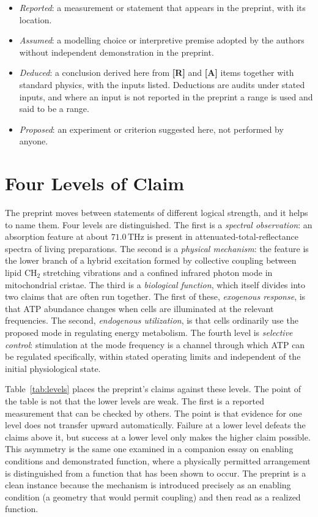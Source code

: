\documentclass[11pt]{article}
\newcommand{\stR}{\textbf{\textcolor{blue!55!black}{[R]}}}
\newcommand{\stA}{\textbf{\textcolor{orange!70!black}{[A]}}}
\newcommand{\stD}{\textbf{\textcolor{green!40!black}{[D]}}}
\newcommand{\stP}{\textbf{\textcolor{violet!80!black}{[P]}}}
\newcommand{\thz}{\,\mathrm{THz}}
\theoremstyle{plain}
\theoremstyle{definition}
\theoremstyle{remark}
\begin{document}
\begin{itemize}[leftmargin=2.2em,itemsep=0.2em]
\item[\stR] \emph{Reported}: a measurement or statement that appears in the preprint, with its location.
\item[\stA] \emph{Assumed}: a modelling choice or interpretive premise adopted by the authors without independent demonstration in the preprint.
\item[\stD] \emph{Deduced}: a conclusion derived here from \stR{} and \stA{} items together with standard physics, with the inputs listed. Deductions are audits under stated inputs, and where an input is not reported in the preprint a range is used and said to be a range.
\item[\stP] \emph{Proposed}: an experiment or criterion suggested here, not performed by anyone.
\end{itemize}

\section{Four Levels of Claim}
\label{sec:levels}

The preprint moves between statements of different logical strength, and it helps to name them. Four levels are distinguished. The first is a \emph{spectral observation}: an absorption feature at about $71.0\thz$ is present in attenuated-total-reflectance spectra of living preparations. The second is a \emph{physical mechanism}: the feature is the lower branch of a hybrid excitation formed by collective coupling between lipid CH$_2$ stretching vibrations and a confined infrared photon mode in mitochondrial cristae. The third is a \emph{biological function}, which itself divides into two claims that are often run together. The first of these, \emph{exogenous response}, is that ATP abundance changes when cells are illuminated at the relevant frequencies. The second, \emph{endogenous utilization}, is that cells ordinarily use the proposed mode in regulating energy metabolism. The fourth level is \emph{selective control}: stimulation at the mode frequency is a channel through which ATP can be regulated specifically, within stated operating limits and independent of the initial physiological state.

Table~\ref{tab:levels} places the preprint's claims against these levels. The point of the table is not that the lower levels are weak. The first is a reported measurement that can be checked by others. The point is that evidence for one level does not transfer upward automatically. Failure at a lower level defeats the claims above it, but success at a lower level only makes the higher claim possible. This asymmetry is the same one examined in a companion essay on enabling conditions and demonstrated function, where a physically permitted arrangement is distinguished from a function that has been shown to occur. The preprint is a clean instance because the mechanism is introduced precisely as an enabling condition (a geometry that would permit coupling) and then read as a realized function.
\end{document}
